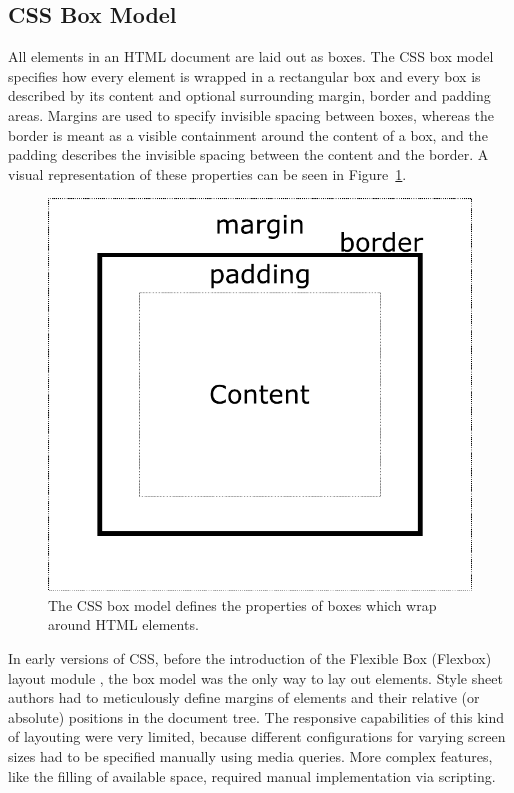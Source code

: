 \subsection{CSS Box Model}
\label{sec:BoxLayout}

All elements in an HTML document are laid out as boxes. The CSS box
model specifies how every element is wrapped in a rectangular box and
every box is described by its content and optional surrounding margin,
border and padding areas. Margins are used to specify invisible
spacing between boxes, whereas the border is meant as a visible
containment around the content of a box, and the padding describes the
invisible spacing between the content and the border. A visual
representation of these properties can be seen in
Figure~\ref{fig:BoxModel}.

\begin{figure}[tp]
\centering
\includegraphics[keepaspectratio,width=\linewidth,height=\thirdh]
{diagrams/box-model.pdf}
\caption[CSS Box Model]{
The CSS box model defines the properties of boxes which wrap around HTML elements.
}
\label{fig:BoxModel}
\end{figure}

In early versions of CSS, before the introduction of the Flexible Box
(Flexbox) layout module \parencite{CSSFlexboxFirstDraft}, the box
model was the only way to lay out elements. Style sheet authors had to
meticulously define margins of elements and their relative (or
absolute) positions in the document tree. The responsive capabilities
of this kind of layouting were very limited, because different
configurations for varying screen sizes had to be specified manually
using media queries. More complex features, like the filling of
available space, required manual implementation via scripting.





